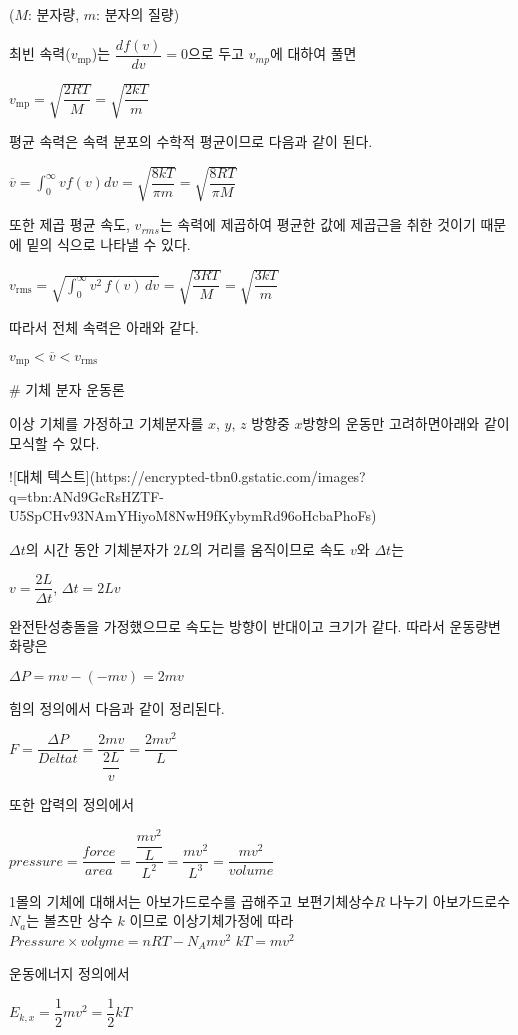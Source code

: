 ($M$: 분자량, $m$: 분자의 질량)

최빈 속력($v_{\mathrm{mp}}$)는 $\dfrac{df(v)}{dv} = 0$으로 두고 $v_{mp}$에 대하여 풀면 

$v_{\mathrm{mp}} = \sqrt {\dfrac{2RT}{M}} = \sqrt {\dfrac{2kT}{m}}$

평균 속력은 속력 분포의 수학적 평균이므로 다음과 같이 된다.

${\overline{v}} = \int_{0}^{\infty} v f(v) dv = \sqrt {\dfrac{8kT}{\pi m}} = \sqrt {\dfrac{8RT}{\pi M}}$


또한 제곱 평균 속도, $v_{rms}$는 속력에 제곱하여 평균한 값에 제곱근을 취한 것이기 때문에 밑의 식으로 나타낼 수 있다.

$v_{\mathrm {rms} } = \sqrt {{\int _{0}^{\infty }v^{2}\, f(v)\, dv}} 
={\sqrt {\dfrac {3RT}{M}}}
= {\sqrt {\dfrac {3kT}{m}}}$

따라서 전체 속력은 아래와 같다.

$v_{\mathrm{mp}}<\overline{v} <v_{\mathrm {rms} }$


# 기체 분자 운동론

이상 기체를 가정하고 기체분자를 $x$, $y$, $z$ 방향중 $x$방향의 운동만 고려하면아래와 같이 모식할 수 있다.

![대체 텍스트](https://encrypted-tbn0.gstatic.com/images?q=tbn:ANd9GcRsHZTF-U5SpCHv93NAmYHiyoM8NwH9fKybymRd96oHcbaPhoFs)

$\Delta t$의 시간 동안 기체분자가 $2L$의 거리를 움직이므로 속도 $v$와 $\Delta t$는

$ v = \dfrac{2L}{\Delta t} $, $\Delta t = {2L}{v}$

완전탄성충돌을 가정했으므로 속도는 방향이 반대이고 크기가 같다. 따라서 운동량변화량은 

$\Delta P = mv - (-mv) = 2mv$

힘의 정의에서 다음과 같이 정리된다.

$F = \dfrac{\Delta P}{Delta t} = \dfrac{2mv}{\dfrac{2L}{v}} = \dfrac{2mv^2}{L}$

또한 압력의 정의에서

$ pressure = \dfrac{force}{area} = \dfrac{\dfrac{mv^2}{L}}{L^2} = \dfrac{mv^2}{L^3} = \dfrac {mv^2}{volume}$

1몰의 기체에 대해서는 아보가드로수를 곱해주고 보편기체상수$R$ 나누기 아보가드로수 $N_a$는 볼츠만 상수 $k$ 이므로 이상기체가정에 따라
$Pressure \times volyme = nRT - N_{A} mv^2$
$kT = mv^2$

운동에너지 정의에서

$E_{k, x} = \dfrac{1}{2} mv^2 = \dfrac{1}{2} kT$

